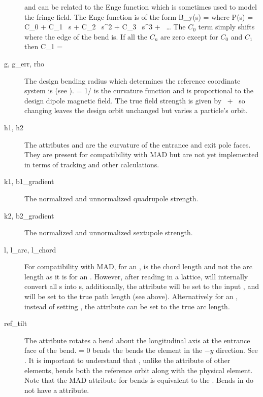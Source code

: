 \begin{description}
 and  can be related to the Enge function which is sometimes
used to model the fringe field. The Enge function is of the form
\Begineq
  B_y(s) = 
\Endeq
where
\Begineq
  P(s) = C_0 + C_1 \, s + C_2 \, s^2 + C_3 \, s^3 + \, \ldots
\Endeq
The $C_0$ term simply shifts where the edge of the bend is. If all the $C_n$
are zero except for $C_0$ and $C_1$ then 
\Begineq
  C_1 = 
\Endeq
  \item[g, g_err, rho] \Newline
The design bending radius which determines the reference coordinate
system is  (see ).  = 1/ is
the curvature function and is proportional to the design dipole
magnetic field. The true field strength is given by
~+~ so changing  leaves the design orbit
unchanged but varies a particle's orbit.
  \item[h1, h2] \Newline
The attributes  and  are the curvature of the entrance
and exit pole faces. They are present for compatibility with MAD but
are not yet implemented in terms of tracking and other calculations.
  \item[k1, b1_gradient] \Newline
The normalized and unnormalized quadrupole strength.
  \item[k2, b2_gradient] \Newline
The normalized and unnormalized sextupole strength. 
  \item[l, l_arc, l_chord]  \Newline
For compatibility with MAD, for an ,  is the chord
length and not the arc length as it is for an .  However,
after reading in a lattice, \bmad will internally convert all
s into s, additionally, the  attribute
will be set to the input , and  will be set to the true
path length (see above). Alternatively for an , instead of
setting , the  attribute can be set to the true arc
length.
  \item[ref_tilt] \Newline
The  attribute rotates a bend about the longitudinal axis
at the entrance face of the bend.  = 0 bends the bends
the element in the $-y$ direction. See . It is
important to understand that , unlike the 
attribute of other elements, bends both the reference orbit along with
the physical element. Note that the MAD  attribute for bends
is equivalent to the \bmad {}. Bends in \bmad do not have
a  attribute.
  \end{description}

